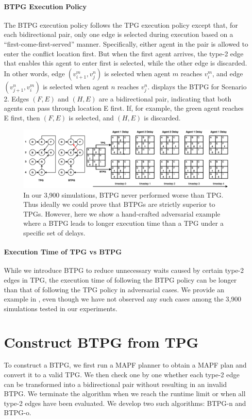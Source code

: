 \documentclass[letterpaper]{article} %
\theoremstyle{definition}
\begin{document}
\paragraph{BTPG Execution Policy}
The BTPG execution policy follows the TPG execution policy except that, for each bidirectional pair, only one edge is selected during execution based on a ``first-come-first-served'' manner. Specifically, either agent in the pair is allowed to enter the conflict location first. But when the first agent arrives, the type-2 edge that enables this agent to enter first is selected, while the other edge is discarded. In other words, edge $(v_{i+1}^m, v_j^n)$ is selected when agent $m$ reaches $v_i^m$, and edge $(v_{j+1}^n, v_{i}^m)$ is selected when agent $n$ reaches $v_j^n$.
 displays the BTPG for Scenario 2.
Edges $(F,E)$ and $(H,E)$ are a bidirectional pair, indicating that both agents can pass through location E first. If, for example, the green agent reaches E first, then $(F,E)$ is selected, and $(H,E)$ is discarded.

\begin{figure}[h]
\centering
\includegraphics[width=\textwidth]{Figs/BTPGWorseEx.png}
\caption{In our 3,900 simulations, BTPG never performed worse than TPG.
Thus ideally we could prove that BTPGs are strictly superior to TPGs.
However, here we show a hand-crafted adversarial example where a BTPG leads to longer execution time than a TPG under a specific set of delays.
}
\label{fig:counter-ex}
\end{figure}
\paragraph{Execution Time of TPG vs BTPG} While we introduce BTPG to reduce unnecessary waits caused by certain type-2 edges in TPG, the execution time of following the BTPG policy can be longer than that of following the TPG policy in adversarial cases. We provide an example in , even though we have not observed any such cases among the 3,900 simulations tested in our experiments.


\section{Construct BTPG from TPG}
To construct a BTPG, we first run a MAPF planner to obtain a MAPF plan and convert it to a valid TPG. We then check one by one whether each type-2 edge can be transformed into a bidirectional pair without resulting in an invalid BTPG. We terminate the algorithm when we reach the runtime limit or when all type-2 edges have been evaluated. We develop two such algorithms: BTPG-n and BTPG-o.
\end{document}
